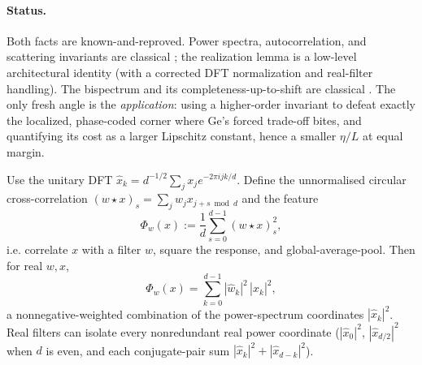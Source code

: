 \paragraph{Status.}
Both facts are known-and-reproved. Power spectra, autocorrelation, and scattering invariants are
classical \citep{brunamallat2012}; the realization lemma is a low-level architectural identity (with
a corrected DFT normalization and real-filter handling). The bispectrum and its completeness-up-to-shift
are classical \citep{invariants_kakarala}. The only fresh angle is the \emph{application}: using a
higher-order invariant to defeat exactly the localized, phase-coded corner where Ge's forced trade-off
bites, and quantifying its cost as a larger Lipschitz constant, hence a smaller $\eta/L$ at equal margin.

\begin{lemma}
\label{lem:ps}
Use the unitary DFT $\hat x_k = d^{-1/2}\sum_j x_j e^{-2\pi i jk/d}$. Define the unnormalised circular
cross-correlation $(w \star x)_s = \sum_j w_j x_{j+s \bmod d}$ and the feature
\[
\Phi_w(x) := \frac1d \sum_{s=0}^{d-1} (w\star x)_s^2 ,
\]
i.e. correlate $x$ with a filter $w$, square the response, and global-average-pool. Then for real
$w,x$,
\[
\Phi_w(x) = \sum_{k=0}^{d-1} |\hat w_k|^2\,|\hat x_k|^2 ,
\]
a nonnegative-weighted combination of the power-spectrum coordinates $|\hat x_k|^2$. Real filters can
isolate every nonredundant real power coordinate ($|\hat x_0|^2$, $|\hat x_{d/2}|^2$ when $d$ is even,
and each conjugate-pair sum $|\hat x_k|^2 + |\hat x_{d-k}|^2$).
\end{lemma}

